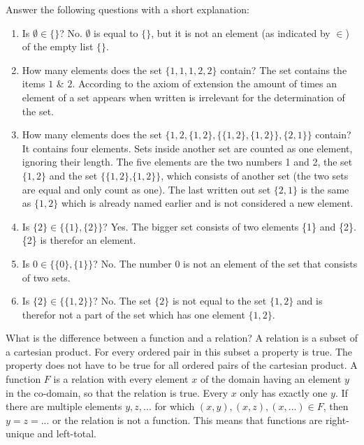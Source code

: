\documentclass{exercise}
\begin{document}
   Answer the following questions with a short explanation:
    \begin{enumerate}
      \item Is $\emptyset \in \{\} $?
      \newline
      No. $\emptyset$ is equal to $\{\}$, but it is not an element (as indicated by $\in$) of the empty list $\{\}$. 
      
      \item How many elements does the set $\{ 1, 1, 1, 2, 2 \} $ contain?
      \newline
      The set contains the items $1$ \& $2$. According to the axiom of extension the amount of times an element of a set appears when written is irrelevant for the determination of the set.
      
      \item How many elements does the set $\{ 1, 2, \{ 1, 2 \}, \{\{1, 2\}, \{1, 2\}\}, \{2, 1\} \}$ contain?
      \newline
      It contains four elements. Sets inside another set are counted as one element, ignoring their length. The five elements are the two numbers 1 and 2, the set $\{1,2\}$ and the set $\{\{1,2\}$,$\{1,2\}\}$, which consists of another set (the two sets are equal and only count as one). The last written out set $\{2,1\}$ is the same as $\{1,2\}$ which is already named earlier and is not considered a new element.
      
      \item Is $\{2\} \in \{ \{ 1 \} , \{ 2 \} \} $?
      \newline
      Yes. The bigger set consists of two elements \{1\} and \{2\}. \{2\} is therefor an element.
      
      \item Is $0 \in \{ \{ 0 \} , \{ 1 \} \} $?
      \newline
      No. The number 0 is not an element of the set that consists of two sets.
      
      \item Is $\{2\} \in \{ \{ 1, 2 \} \} $?
      \newline
      No. The set $\{2\}$ is not equal to the set $\{1,2\}$ and is therefor not a part of the set which has one element $\{1,2\}$.

    \end{enumerate}

   What is the difference between a function and a relation?
  \newline
  A relation is a subset of a cartesian product. For every ordered pair in this subset a property is true. The property does not have to be true for all ordered pairs of the cartesian product.
  \newline
  A function $F$ is a relation with every element $x$ of the domain having an element $y$ in the co-domain, so that the relation is true. Every $x$ only has exactly one $y$. If there are multiple elements $y,z,...$ for which $(x,y),(x,z),(x,...) \in F$, then $y=z=...$ or the relation is not a function. This means that functions are right-unique and left-total.
\end{document}
